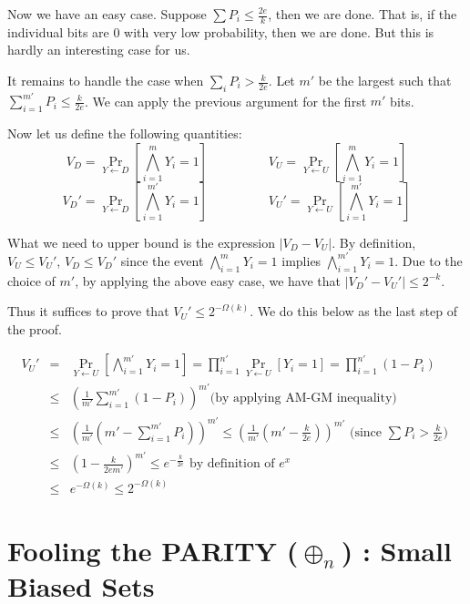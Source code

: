 Now we have an easy case. Suppose $\sum P_i \le \frac{2e}{k}$, then we are done. That is, if the individual bits are $0$ with very low probability, then we are done. But this is hardly an interesting case for us.

\newpage

It remains to handle the case when $\sum_i P_i > \frac{k}{2e}$. Let $m'$ be the largest such that $\sum_{i=1}^{m'} P_i \le \frac{k}{2e}$. We can apply the previous argument for the first $m'$ bits.

Now let us define the following quantities:
$$ V_D = \Pr_{Y \leftarrow D} \left[ \bigwedge_{i=1}^m Y_i = 1 \right] \hspace{2cm} V_U = \Pr_{Y \leftarrow U} \left[ \bigwedge_{i=1}^m Y_i = 1 \right] $$
$$ V_D' = \Pr_{Y \leftarrow D} \left[ \bigwedge_{i=1}^{m'} Y_i = 1 \right] \hspace{2cm} V_U' = \Pr_{Y \leftarrow U} \left[ \bigwedge_{i=1}^{m'} Y_i = 1 \right] $$

What we need to upper bound is the expression $|V_D - V_U|$.
By definition, $V_U \le V_U'$, $V_D \le V_D'$ since the event $\bigwedge_{i=1}^m Y_i = 1$ implies $\bigwedge_{i=1}^{m'} Y_i = 1$. Due to the choice of $m'$, by applying the above easy case, we have that $|V_D'-V_U'| \le 2^{-k}$.

Thus it suffices to prove that $V_U' \le 2^{-\Omega(k)}$. We do this below as the last step of the proof.

\begin{eqnarray*}
V_U' & = & \Pr_{Y \leftarrow U} \left[ \bigwedge_{i=1}^{m'} Y_i = 1 \right] = \prod_{i=1}^{n'} \Pr_{Y \leftarrow U} \left[ Y_i = 1 \right] = \prod_{i=1}^{n'} \left(1-P_i\right) \\
& \le & \left(\frac{1}{m'} \sum_{i=1}^{m'} (1-P_i) \right)^{m'} \textrm {(by applying AM-GM inequality)} \\
& \le & \left(\frac{1}{m'} \left(m'-\sum_{i=1}^{m'} P_i\right) \right)^{m'} \le \left(\frac{1}{m'} \left(m'-\frac{k}{2e} \right) \right)^{m'} \textrm{ (since $\sum P_i > \frac{k}{2e}$) }\\
& \le & \left(1-\frac{k}{2em'}\right)^{m'} \le e^{-\frac{k}{2e}} \textrm{ by definition of $e^x$ } \\
& \le & e^{-\Omega(k)} \le 2^{-\Omega(k)}
\end{eqnarray*}

\section{Fooling the PARITY ($\oplus_n$) : Small Biased Sets}

